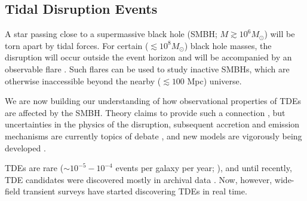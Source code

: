 %
%
%
%

\subsection{Tidal Disruption Events}
\def\secname{tdes}\label{sec:\secname}


A star passing close to a supermassive black hole (SMBH;
$M\gtrsim10^{6}M_{\odot}$) will be torn apart by tidal forces. For
certain ($\lesssim10^{8}M_{\odot}$) black hole masses, the disruption
will occur outside the event horizon and will be accompanied by an
observable flare \citep{Hills1975, Rees1988}. Such flares can be used to
study inactive SMBHs, which are otherwise inaccessible beyond the nearby
($\lesssim100$ Mpc) universe.

We are now building our understanding of how observational properties of
TDEs are affected by the SMBH. Theory claims to provide such a
connection \citep[e.g.][]{Lodato2009, Guillochon2014}, but uncertainties
in the physics of the disruption, subsequent accretion and emission
mechanisms are currently topics of debate \citep[e.g.][]{Strubbe2015,
Guillochon2014, Roth2015}, and new models are vigorously being developed
\citep[e.g.][]{Piran2015, Hayasaki2015, Svirski2015, Bonnerot2015}.

TDEs are rare ($\sim10^{-5}-10^{-4}$ events per galaxy per year;
\citealp{Wang2004, Stone2015}), and until recently, TDE candidates were
discovered mostly in archival data \citep[e.g.][]{Donley2002,
Gezari2006, Esquej2007}. Now, however, wide-field transient surveys have
started discovering TDEs in real time.

